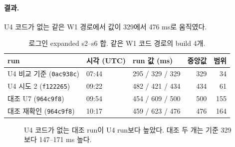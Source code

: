 \paragraph{결과.}
U4 코드가 없는 같은 W1 경로에서 값이 329에서 476 ms로 움직였다.
\begin{table}[H]
  \caption{로그인 expanded s2--s6 합. 같은 W1 코드 경로의 build 4개.}
  \label{tab:le-drift}
  \centering\small
  \begin{tabularx}{\linewidth}{@{}L{4.2cm} L{1.8cm} L{3.0cm} r r@{}}
    \toprule
    run & 시각 (UTC) & run 값 (ms) & 중앙값 & 범위 \\
    \midrule
    U4 비교 기준 (\texttt{0ac938c}) & 07:44 & 295 / 329 / 329 & 329 & 34 \\
    \midrule
    U4 시도 2 (\texttt{f122265}) & 09:22 & 482 / 421 / 434 & 434 & 61 \\
    \midrule
    대조 U7 (\texttt{964c9f8}) & 09:54 & 454 / 609 / 500 & 500 & 155 \\
    \midrule
    대조 재확인 (\texttt{964c9f8}) & 10:17 & 459 / 623 / 476 & 476 & 164 \\
    \bottomrule
  \end{tabularx}
\end{table}

\begin{figure}[H]
  \centering
  \caption{U4 코드가 없는 대조 run이 U4 run보다 높았다. 대조 두 개는 기준 329보다 147--171 ms 높다.}
  \label{fig:le-drift}
\end{figure}

